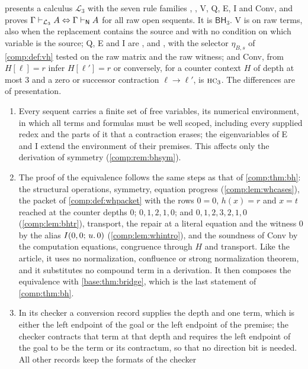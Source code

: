 \begin{remark}
\label{comp:rem:bcsame}
 presents a calculus $\mathcal L_3$ with the seven
rule families , , V, Q, E, I and Conv, and
proves $\Gamma\vdash_{\mathcal L_3}A\Leftrightarrow\Gamma\vdash_{\mathsf{N}}A$
for all raw open sequents. It is $\mathsf{BH}_3$. V is  on
raw terms, also when the replacement contains the source and with no
condition on which variable is the source; Q, E and I are ,
 and , with the selector $\eta_{B,s}$ of
\cref{comp:def:vh} tested on the raw matrix and the raw witness; and Conv,
from $H[\ell]=r$ infer $H[\ell']=r$ or conversely, for a counter context $H$
of depth at most $3$ and a zero or successor contraction
$\ell\to\ell'$, is $\rulename{HC}_3$. The differences are of presentation.
\begin{enumerate}[label=(\alph*)]
\item Every sequent carries a finite set of free variables, its numerical
 environment, in which all terms and formulas must be well scoped,
 including every supplied redex and the parts of it that a contraction
 erases; the eigenvariables of E and I extend the environment of their
 premises. This affects only the derivation of symmetry
 (\cref{comp:rem:bhsym}).
\item The proof of the equivalence follows the same steps as that of
 \cref{comp:thm:bh}: the structural operations, symmetry, equation progress
 (\cref{comp:lem:whcases}), the packet of \cref{comp:def:whpacket} with the
 rows $0=0$, $h(x)=r$ and $x=t$ reached at the counter depths $0$;
 $0,1,2,1,0$; and $0,1,2,3,2,1,0$ (\cref{comp:lem:bhtr}), transport, the
 repair at a literal equation and the witness $0$ by the alias
 $I(0,0;\,u.\,0)$ (\cref{comp:lem:whintro}), and the soundness of Conv by
 the computation equations, congruence through $H$ and transport. Like the
 article, it uses no normalization, confluence or strong normalization
 theorem, and it substitutes no compound term in a derivation. It then
 composes the equivalence with \cref{base:thm:bridge}, which is the last
 statement of \cref{comp:thm:bh}.
\item In its checker a conversion record supplies the depth and one term,
 which is either the left endpoint of the goal or the left endpoint of the
 premise; the checker contracts that term at that depth and requires the
 left endpoint of the goal to be the term or its contractum, so that no
 direction bit is needed. All other records keep the formats of the checker

\end{enumerate}
\end{remark}
